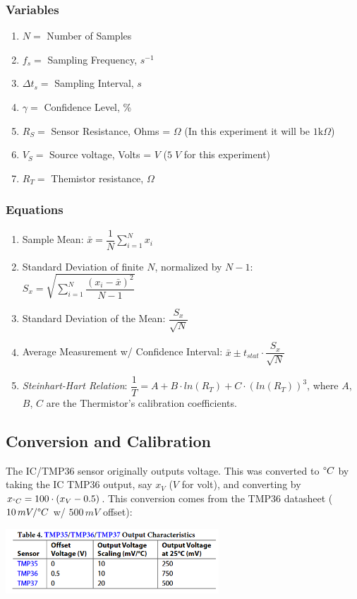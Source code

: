 \documentclass{article}
\begin{document}
\subsubsection*{Variables}
\begin{enumerate}[label = \roman*.]
    \item \(N = \) Number of Samples
    \item \(f_{s} = \) Sampling Frequency, $s^{-1}$
    \item \(\Delta t_{s} = \) Sampling Interval, $s$
    \item \(\gamma = \) Confidence Level, \%
    \item \(R_{S} = \) Sensor Resistance, Ohms = $\Omega$ (In this experiment it will be $1\text{k}\Omega$)
    \item \(V_{S} = \) Source voltage, Volts = $V$ ($5\;V$ for this experiment)
    \item \(R_{T} = \) Themistor resistance, $\Omega$
\end{enumerate}

\subsubsection*{Equations}
\begin{enumerate}[label = \Roman*.]
    \item Sample Mean: \(\bar{x} = \dfrac{1}{N}\displaystyle\sum_{i=1}^{N} x_{i}\) 
    \item Standard Deviation of finite $N$, normalized by $N-1$: \(S_{x} = \sqrt{\displaystyle\sum_{i=1}^{N} \dfrac{(x_{i} - \bar{x})^{2}}{N-1}}\)
    \item Standard Deviation of the Mean: \(\dfrac{S_{x}}{\sqrt{N}}\)
    \item Average Measurement w/ Confidence Interval: \(\bar{x} \pm t_{stat}\cdot \dfrac{S_{x}}{\sqrt{N}}\)
    \item \textit{Steinhart-Hart Relation}: \(\dfrac{1}{T} = A + B\cdot ln(R_{T}) + C\cdot (ln(R_{T}))^{3}\), where $A$, $B$, $C$ are the Thermistor's calibration coefficients.
\end{enumerate}  

\subsection*{Conversion and Calibration}
The IC/TMP36 sensor originally outputs voltage. This was converted to $\degree C$ by taking the IC TMP36 output, say $x_{V}$ ($V$ for volt), and converting by $x_{\degree C} = 100\cdot(x_{V}-0.5)$. This conversion comes from the TMP36 datasheet ($10\,mV/\degree C$ w/ $500\,mV$ offset):
\begin{center}
    \href{https://www.analog.com/media/en/technical-documentation/data-sheets/tmp35_36_37.pdf}{\includegraphics[width = 0.6\textwidth]{lab2images/tmp36_offset_documentation.png}}
\end{center}
\end{document}

